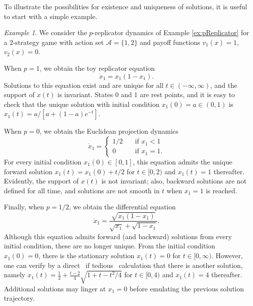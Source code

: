 \documentclass[reqno]{amsart}
\theoremstyle{plain}
\theoremstyle{definition}
\theoremstyle{remark}
\newtheorem{example}[theorem]{Example}
\numberwithin{equation}{section}
\numberwithin{theorem}{section}
\begin{document}
To illustrate the possibilities for existence and uniqueness of solutions, it is useful to start with a simple example.

\begin{example}\label{ex:EU}
We consider the $p$-replicator dynamics of Example \ref{ex:pReplicator} for a $2$-strategy game with action set ${\mathcal{A}} = \{1,2\}$ and payoff functions ${v}_{1}(x) = 1$, ${v}_{2}(x) = 0$.

When $p=1$, we obtain the toy replicator equation
\begin{equation}
\dot x_{1}
	= x_{1}(1-x_{1}).
\end{equation}
Solutions to this equation exist and are unique for all $t \in (-\infty, \infty)$, and the support of $x(t)$ is invariant.
States $0$ and $1$ are rest points, and it is easy to check that the unique solution with initial condition $x_{1}(0) = a \in (0,1)$ is $x_{1}(t) = a / [a + (1 - a) e^{-t}]$.

When $p=0$, we obtain the Euclidean projection dynamics
\begin{equation}\label{eq:ToyEPD}
\dot x_{1}
	= \begin{cases}
	1/2
		&\quad
		\text{if $x_{1} < 1$}
		\\
	0
		&\quad
		\text{if $x_{1} = 1$}.
	\end{cases}
\end{equation}
For every initial condition $x_{1}(0) \in [0,1]$, this equation admits the unique forward solution $x_{1}(t) =x_{1}(0)+ t/2$ for $t \in [0, 2)$ and $x_{1}(t)=1$ thereafter.
Evidently, the support of $x(t)$ is not invariant;
also, backward solutions are not defined for all time, and solutions are not smooth in $t$ when $x_{1}=1$ is reached.

Finally, when $p=1/2$, we obtain the differential equation
\begin{equation}
\label{eq:non-Lipschitz}
\dot x_{1}
	= \frac{\sqrt{x_{1} (1-x_{1})}}{\sqrt{x_{1}} + \sqrt{1-x_{1}}}.
\end{equation}
Although this equation admits forward (and backward) solutions from every initial condition, these are no longer unique.
From the initial condition $x_{1}(0) = 0$, there is the stationary solution $x_{1}(t) = 0$ for $t \in[0, \infty)$.
However, one can verify by a direct \textendash\ if tedious \textendash\ calculation that there is another solution, namely $x_{1}(t) = \frac{1}{2} + \frac{t-2}{4} \sqrt{1 + t - t^{2}/4}$ for $t \in [0, 4)$ and $x_{1}(t) =4$ thereafter.
Additional solutions may linger at $x_{1} = 0$ before emulating the previous solution trajectory.
\end{example}
\end{document}

